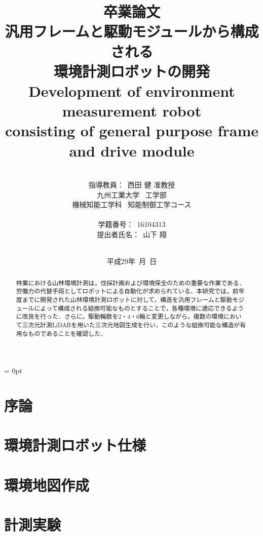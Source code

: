 \documentclass[a4paper,12pt]{jarticle}
\title{卒業論文\\
汎用フレームと駆動モジュールから構成される\\環境計測ロボットの開発\\
{\large Development of environment measurement robot \\consisting of general purpose frame and drive module}
}
\author{\vspace{20mm}\\
指導教員：\ 西田 \hspace{0mm} 健 准教授\\
九州工業大学\ \hspace{0mm} 工学部\\
機械知能工学科\ \hspace{0mm} 知能制御工学コース \\
\vspace{0mm}\\
学籍番号：\ 16104313\\
提出者氏名：\ 山下 \hspace{0mm} 翔\\\vspace{5mm}\\ }
\date{平成29年\ 月\ 日}
\begin{document}
\titlepage
\maketitle
\thispagestyle{empty} \newpage
{}
\setcounter{page}{1}
\parindent = 0pt %


\begin{abstract}
\par 林業における山林環境計測は，伐採計画および環境保全のための重要な作業である．労働力の代替手段としてロボットによる自動化が求められている．本研究では，前年度までに開発された山林環境計測ロボットに対して，構造を汎用フレームと駆動モジュールによって構成される組換可能なものとすることで，各種環境に適応できるように改良を行った．さらに，駆動輪数を2・4・6輪と変更しながら，複数の環境において三次元計測LiDARを用いた三次元地図生成を行い，このような組換可能な構造が有用なものであることを確認した．
\end{abstract}
\thispagestyle{empty}
\newpage
\thispagestyle{empty}
\tableofcontents
\newpage
\section{序論} \label{intro}

\newpage
\section{環境計測ロボット仕様} \label{spec}

\newpage
\section{環境地図作成} \label{mapping}

\newpage
\section{計測実験} \label{experiment}


\newpage
\end{document}
